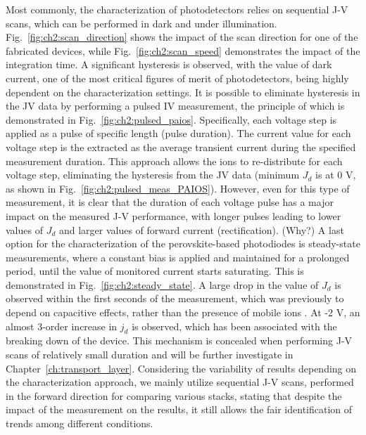 Most commonly, the characterization of photodetectors relies on sequential J-V scans, which can be performed in dark and under illumination. Fig.~\ref{fig:ch2:scan_direction} shows the impact of the scan direction for one of the fabricated devices, while Fig.~\ref{fig:ch2:scan_speed} demonstrates the impact of the integration time. A significant hysteresis is observed, with the value of dark current, one of the most critical figures of merit of photodetectors, being highly dependent on the characterization settings. It is possible to eliminate hysteresis in the JV data by performing a pulsed IV measurement, the principle of which is demonstrated in Fig.~\ref{fig:ch2:pulsed_paios}. Specifically, each voltage step is applied as a pulse of specific length (pulse duration). The current value for each voltage step is the extracted as the average transient current during the specified measurement duration. This approach allows the ions to re-distribute for each voltage step, eliminating the hysteresis from the JV data (minimum $J_d$ is at 0 V, as shown in Fig.~\ref{fig:ch2:pulsed_meas_PAIOS}). However, even for this type of measurement, it is clear that the duration of each voltage pulse has a major impact on the measured J-V performance, with longer pulses leading to lower values of $J_d$ and larger values of forward current (rectification). (Why?) A last option for the characterization of the perovskite-based photodiodes is steady-state measurements, where a constant bias is applied and maintained for a prolonged period, until the value of monitored current starts saturating. This is demonstrated in Fig.~\ref{fig:ch2:steady_state}. A large drop in the value of $J_d$ is observed within the first seconds of the measurement, which was previously to depend on capacitive effects, rather than the presence of mobile ions \cite{Ollearo2021UltralowGeneration}. At -2 V, an almost 3-order increase in $j_d$ is observed, which has been associated with the breaking down of the device. This mechanism is concealed when performing J-V scans of relatively small duration and will be further investigate in Chapter~\ref{ch:transport_layer}. Considering the variability of results depending on the characterization approach, we mainly utilize sequential J-V scans, performed in the forward direction for comparing various stacks, stating that despite the impact of the measurement on the results, it still allows the fair identification of trends among different conditions. 


